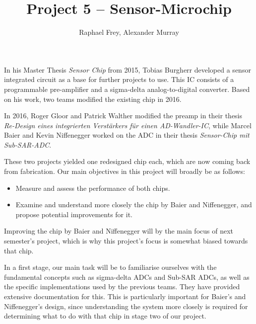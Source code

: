 \documentclass[a4paper,10pt]{article}
\title{Project 5 -- Sensor-Microchip}
\author{Raphael Frey, Alexander Murray}
\affil{Institute for Mikroelektronics\\FHNW -- Hochschule f\"ur Technik\\ Studiengang EIT}
\begin{document}
\maketitle



In his Master Thesis \emph{Sensor Chip} from 2015, Tobias Burgherr developed a
sensor  integrated circuit  as a  base for  further projects  to use. This  IC
consists of  a programmable pre-amplifier and  a sigma-delta analog-to-digital
converter. Based on his work, two teams modified the existing chip in 2016.

In 2016, Roger  Gloor and Patrick Walther modified the  preamp in their thesis
\emph{Re-Design eines  integrierten Verst\"arkers f\"ur  einen AD-Wandler-IC},
while Marcel  Baier and Kevin  Niffenegger worked on  the ADC in  their thesis
\emph{Sensor-Chip mit Sub-SAR-ADC}.

These two projects yielded one redesigned chip each, which are now coming back
from fabrication. Our main objectives in this project will broadly be as follows:

\begin{itemize}
    \item
        Measure and assess the performance of both chips.
    \item
        Examine and understand more closely the chip by Baier and Niffenegger,
        and propose potential improvements for it.
\end{itemize}

Improving the  chip by Baier  and Niffenegger will by  the main focus  of next
semester's  project, which  is why  this  project's focus  is somewhat  biased
towards that chip.

In a  first stage,  our main task  will be to  familiarise ourselves  with the
fundamental concepts such as sigma-delta ADCs and Sub-SAR ADCs, as well as the
specific  implementations  used  by  the previous  teams. They  have  provided
extensive documentation  for this. This is particularly  important for Baier's
and  Niffenegger's design,  since  understanding the  system  more closely  is
required  for determining  what to  do  with that  chip  in stage  two of  our
project.
\end{document}
